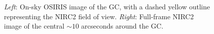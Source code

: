 \documentclass[]{spie}  %
\begin{document}
\begin{figure}[!h]
  \hspace{-20mm}
  \caption{\footnotesize \textit{Left}: On-sky OSIRIS image of the GC, with a dashed yellow outline representing the NIRC2 field of view. \textit{Right}: Full-frame NIRC2 image of the central ${\sim}10$ arcseconds around the GC.} \label{fig:gc_osiris_nirc2}
\end{figure}


\listoffigures
\end{document}
